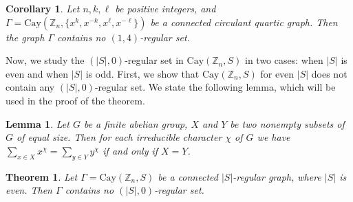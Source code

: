 \documentclass[12pt]{article}
\newtheorem{cor}[formula]{Corollary}
\newtheorem{lem}[formula]{Lemma}
\newtheorem{thm}[formula]{Theorem}
\begin{document}
\begin{cor}\label{$(1,4)$-regular set}
	Let $n, k, \ell$ be positive integers, and  $\Gamma = \mathrm{Cay}(\mathbb{Z}_n, \{x^k, x^{-k}, x^\ell, x^{-\ell}\})$ be a connected circulant quartic graph. Then the graph $\Gamma$ contains no $(1,4)$-regular set.
	\end{cor}
	Now, we study the $(|S|,0)$-regular set in $\mathrm{Cay}(\mathbb{Z}_n, S)$ in two cases: when $|S|$ is even and when $|S|$ is odd. First, we show that $\mathrm{Cay}(\mathbb{Z}_n, S)$ for even $|S|$ does not contain any $(|S|,0)$-regular set. We state the following lemma, which will be used in the proof of the theorem.
	\begin{lem}\label{X=Y}
		Let $G$ be a finite abelian group, $X$ and $Y$ be two nonempty subsets of $G$ of equal size. Then for each irreducible character $\chi$ of $G$ we have $\sum\limits_{x \in X} x ^ \chi = \sum\limits_{y \in Y} y ^ \chi$ if and only if $X=Y$.
		\end{lem}
\begin{thm}\label{$(|S|,0)$}
Let  $\Gamma = \mathrm{Cay}(\mathbb{Z}_n, S)$ be a connected $|S|$-regular graph, where $|S|$ is even. Then $\Gamma$ contains no $(|S|,0)$-regular set.	
\end{thm}	
\end{document}
